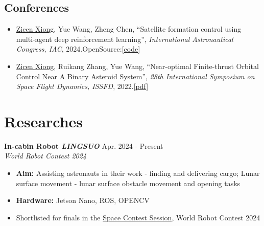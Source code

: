 \documentclass[11pt, a4paper]{article}
\begin{document}
\subsection*{Conferences}
\begin{itemize}
    \item   \underline{Zicen Xiong}, Yue Wang, Zheng Chen, ``Satellite formation control using multi-agent deep reinforcement learning'',  \textit{International Astronautical Congress, IAC}, 2024.OpenSource:[\href{    https://github.com/ZCen-Xiong/SAC_formation_flying}{code}]


\end{itemize}

\begin{itemize}
    \item   \underline{Zicen Xiong}, Ruikang Zhang, Yue Wang, ``Near-optimal Finite-thrust Orbital Control Near A Binary Asteroid System'',  \textit{28th International Symposium on Space Flight Dynamics, ISSFD}, 2022.[\href{https://issfd-28.casconf.cn/static/1474711509593624577/pages/file/191f4ea3ad564ddf93bcccf7b4e5248e.pdf}{pdf}]
\end{itemize}



\section*{Researches}

\begin{researchitem}
    \item \textbf{In-cabin Robot \textit{LINGSUO} } \hfill Apr. 2024 - Present \\
    \textit{World Robot Contest 2024}
    \begin{itemize}[noitemsep, topsep=0pt]
        \item \textbf{Aim:} Assisting astronauts in their work - finding and delivering cargo; Lunar surface movement - lunar surface obstacle movement and opening tasks  
        \item\textbf{Hardware:} Jetson Nano, ROS, OPENCV 
        \item  Shortlisted for finals in the  \href{https://www.worldrobotconference.com/cn/view/1939.html}{Space Contest Session}, World Robot Contest 2024
    \end{itemize}
\end{researchitem}
\end{document}

